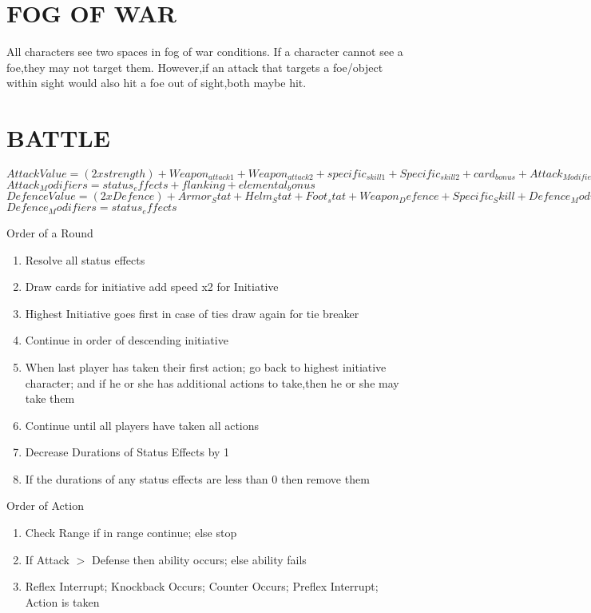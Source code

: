 \section{FOG OF WAR}
All characters see two spaces in fog of war conditions.  If a character cannot see a foe,they may not target them.  However,if an attack that targets a foe/object within sight would also hit a foe out of sight,both maybe hit.  

\section{BATTLE }
$Attack Value = (2 x strength)  + Weapon_{attack1} +Weapon_{attack2}+ specific_{skill1} + Specific_{skill2}  + card_{bonus}+ Attack_{Modifiers}$
$Attack_Modifiers = status_effects+ flanking + elemental_bonus$
$Defence Value = (2 x Defence)+ Armor_Stat+ Helm_Stat + Foot_stat+ Weapon_Defence+ Specific_Skill + Defence_Modifiers+5$
$Defence_Modifiers  =   status_effects$

Order of a Round
\begin{enumerate}
\item Resolve all status effects 
\item Draw cards for initiative add speed x2 for Initiative
\item Highest Initiative goes first in case of ties draw again for tie breaker
\item Continue in order of descending initiative
\item When last player has taken their first action; go back to highest initiative character; and if he or she has additional actions to take,then he or she may take them
\item Continue until all players have taken all actions
\item Decrease Durations of Status Effects by 1
\item If the durations of any status effects are less than 0 then remove them
\end{enumerate} 

 Order of Action
\begin{enumerate}
\item Check Range if in range continue; else stop
\item If Attack $>$ Defense then ability occurs; else ability fails
\item Reflex Interrupt; Knockback Occurs; Counter Occurs; Preflex Interrupt; Action is taken
\end{enumerate}

